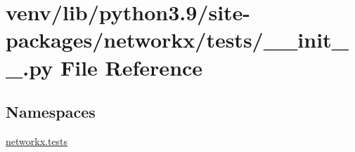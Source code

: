 \hypertarget{venv_2lib_2python3_89_2site-packages_2networkx_2tests_2____init_____8py}{}\section{venv/lib/python3.9/site-\/packages/networkx/tests/\+\_\+\+\_\+init\+\_\+\+\_\+.py File Reference}
\label{venv_2lib_2python3_89_2site-packages_2networkx_2tests_2____init_____8py}
\subsection*{Namespaces}
\begin{DoxyCompactItemize}
\item 
 \hyperlink{namespacenetworkx_1_1tests}{networkx.\+tests}
\end{DoxyCompactItemize}
